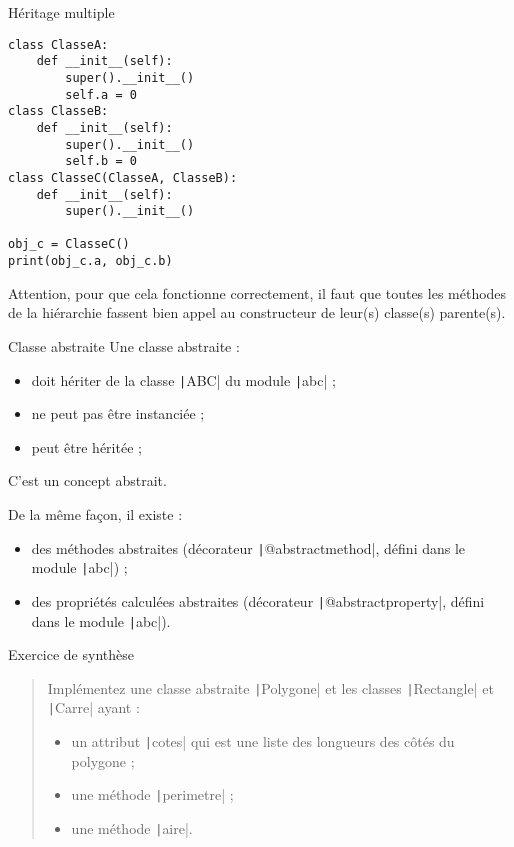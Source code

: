 \documentclass[10pt]{beamer}
\begin{document}
\begin{frame}[fragile]{Héritage multiple}
  \begin{beamercodeblock}
    \begin{verbatim}
class ClasseA:
    def __init__(self):
        super().__init__()
        self.a = 0
class ClasseB:
    def __init__(self):
        super().__init__()
        self.b = 0
class ClasseC(ClasseA, ClasseB):
    def __init__(self):
        super().__init__()

obj_c = ClasseC()
print(obj_c.a, obj_c.b)
    \end{verbatim}
  \end{beamercodeblock}

  Attention, pour que cela fonctionne correctement, il faut que toutes les méthodes de la hiérarchie fassent bien appel au constructeur de leur(s) classe(s) parente(s).
\end{frame}

\begin{frame}[fragile]{Classe abstraite}
  Une classe abstraite :

  \begin{itemize}
    \item doit hériter de la classe \texttt|ABC| du module \texttt|abc| ;
    \item ne peut pas être instanciée ;
    \item peut être héritée ;
  \end{itemize}

  C'est un \alert{concept abstrait}.

  \pause

  De la même façon, il existe :

  \begin{itemize}
    \item des méthodes abstraites (décorateur \texttt|@abstractmethod|, défini dans le module \texttt|abc|) ;
    \item des propriétés calculées abstraites (décorateur \texttt|@abstractproperty|, défini dans le module \texttt|abc|).
  \end{itemize}
\end{frame}

\begin{frame}[fragile]{Exercice de synthèse}
  \begin{quote}
    Implémentez une classe abstraite \texttt|Polygone| et les classes \texttt|Rectangle| et \texttt|Carre| ayant :
    \begin{itemize}
      \item un attribut \texttt|cotes| qui est une liste des longueurs des côtés du polygone ;
      \item une méthode \texttt|perimetre| ;
      \item une méthode \texttt|aire|.
    \end{itemize}
  \end{quote}
\end{frame}
\end{document}
